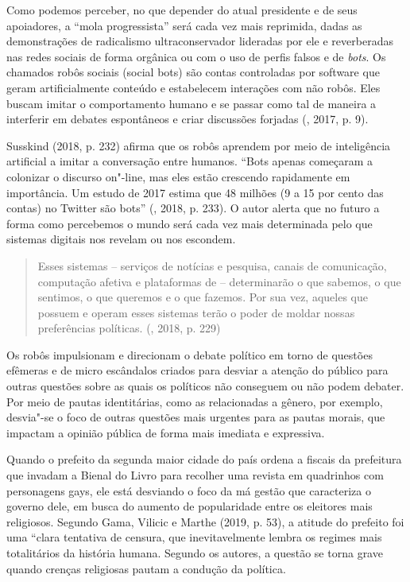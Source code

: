 Como podemos perceber, no que depender do atual presidente e de seus
apoiadores, a ``mola progressista'' será cada vez mais reprimida, dadas
as demonstrações de radicalismo ultraconservador lideradas por ele e
reverberadas nas redes sociais de forma orgânica ou com o uso de perfis
falsos e de \emph{bots}. Os chamados robôs sociais (social bots) são
contas controladas por software que geram artificialmente conteúdo e
estabelecem interações com não robôs. Eles buscam imitar o comportamento
humano e se passar como tal de maneira a interferir em debates
espontâneos e criar discussões forjadas (, 2017,
p. 9).

Susskind (2018, p. 232) afirma que os robôs aprendem por meio de
inteligência artificial a imitar a conversação entre humanos. ``Bots
apenas começaram a colonizar o discurso on"-line, mas eles estão
crescendo rapidamente em importância. Um estudo de 2017 estima que 48
milhões (9 a 15 por cento das contas) no Twitter são bots'' (,
2018, p. 233). O autor alerta que no futuro a forma como percebemos o
mundo será cada vez mais determinada pelo que sistemas digitais nos
revelam ou nos escondem.

\begin{quote}
Esses sistemas -- serviços de notícias e pesquisa, canais de
comunicação, computação afetiva e plataformas de  -- determinarão o
que sabemos, o que sentimos, o que queremos e o que fazemos. Por sua
vez, aqueles que possuem e operam esses sistemas terão o poder de moldar
nossas preferências políticas. (, 2018, p. 229)
\end{quote}

Os robôs impulsionam e direcionam o debate político em torno de questões
efêmeras e de micro escândalos criados para desviar a atenção do público
para outras questões sobre as quais os políticos não conseguem ou não
podem debater. Por meio de pautas identitárias, como as relacionadas a
gênero, por exemplo, desvia"-se o foco de outras questões mais urgentes
para as pautas morais, que impactam a opinião pública de forma mais
imediata e expressiva.

Quando o prefeito da segunda maior cidade do país ordena a fiscais da
prefeitura que invadam a Bienal do Livro para recolher uma revista em
quadrinhos com personagens gays, ele está desviando o foco da má gestão
que caracteriza o governo dele, em busca do aumento de popularidade
entre os eleitores mais religiosos. Segundo Gama, Vilicic e Marthe
(2019, p. 53), a atitude do prefeito foi uma ``clara tentativa de
censura, que inevitavelmente lembra os regimes mais totalitários da
história humana. Segundo os autores, a questão se torna grave quando
crenças religiosas pautam a condução da política.

